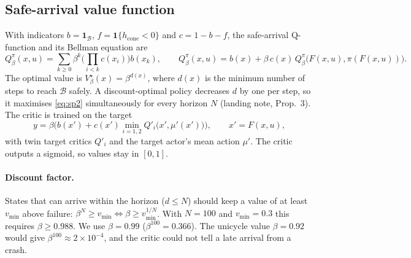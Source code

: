 \documentclass[11pt,a4paper]{article}
\newcommand{\B}{\mathcal{B}}
\newcommand{\hc}{h_{\mathrm{cone}}}
\begin{document}
\subsection{Safe-arrival value function}
With indicators $b=\mathbf{1}_{\B}$, $f=\mathbf{1}\{\hc<0\}$ and $c=1-b-f$, the safe-arrival Q-function and its
Bellman equation are
\begin{equation}
Q^\pi_\beta(x,u)=\sum_{k\ge0}\beta^k\Big(\prod_{i<k}c(x_i)\Big)b(x_k),\qquad
Q^\pi_\beta(x,u)=b(x)+\beta\,c(x)\,Q^\pi_\beta\big(F(x,u),\pi(F(x,u))\big).
\label{eq:value}
\end{equation}
The optimal value is $V^\star_\beta(x)=\beta^{d(x)}$, where $d(x)$ is the minimum number of steps to
reach $\B$ safely. A discount-optimal policy decreases $d$ by one per step, so it maximises
\eqref{eq:sp2} simultaneously for every horizon $N$ (landing note, Prop.~3). The critic is trained on the target
\begin{equation}
y=\beta\Big(b(x')+c(x')\min_{i=1,2}Q'_i\big(x',\mu'(x')\big)\Big),\qquad x'=F(x,u),
\label{eq:target}
\end{equation}
with twin target critics $Q'_i$ and the target actor's mean action $\mu'$. The critic outputs a sigmoid, so
values stay in $[0,1]$.

\paragraph{Discount factor.} States that can arrive within the horizon ($d\le N$) should keep a value of at
least $v_{\min}$ above failure: $\beta^N\ge v_{\min}\iff\beta\ge v_{\min}^{1/N}$. With $N=100$ and
$v_{\min}=0.3$ this requires $\beta\ge0.988$. We use $\beta=0.99$ ($\beta^{100}=0.366$). The unicycle value
$\beta=0.92$ would give $\beta^{100}\approx2\times10^{-4}$, and the critic could not tell a late arrival
from a crash.
\end{document}
